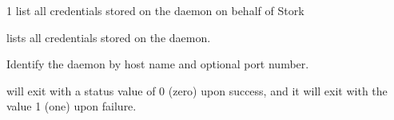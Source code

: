 \begin{ManPage}{\label{man-stork-list-cred}}{1}
{list all credentials stored on the  daemon on behalf of Stork}
\Synopsis {}
\ToolArgsBase




\Description 

 lists all credentials stored on the  daemon.


\begin{Options}
  \ToolArgsBaseDesc
    {Identify the  daemon by host name and optional port number.}
\end{Options}

\ExitStatus

 will exit with a status value of 0 (zero) upon success,
and it will exit with the value 1 (one) upon failure.

\end{ManPage}
